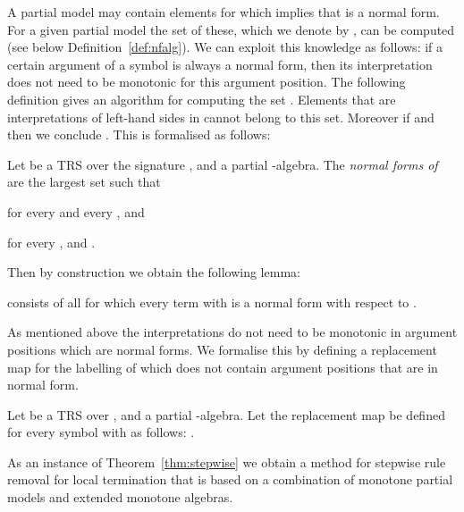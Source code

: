 A partial model 
may contain elements 
for which  implies that  is a normal form.
For a given partial model the set of these, which we denote by , can be computed (see below Definition~\ref{def:nfalg}).
We can exploit this knowledge as follows:
if a certain argument of a symbol 
is always a normal form, then its interpretation 
does not need to be monotonic for this argument position.
The following definition gives an algorithm for computing the set .
Elements that are interpretations  of left-hand sides in 
cannot belong to this set. Moreover if 
and  then we conclude .
This is formalised as follows:
\begin{definition}\normalfont\label{def:nfalg}
  Let  be a TRS over the signature , and  a partial -algebra.
  The \emph{normal forms  of }
  are the largest set  such that
  
  for every  and every ,
  and
   
  for every ,  and .
\end{definition}
Then by construction we obtain the following lemma:
\begin{lemma}\label{lem:nfalg}
   consists of all  
  for which 
  every term  with  is a normal form with respect to .
\end{lemma}
As mentioned above the interpretations do not need to be monotonic in argument positions
which are normal forms. We formalise this by defining a replacement map 
for the labelling  of  which does not contain
argument positions that are in normal form.
\begin{definition}\normalfont\label{def:qtransform}
  Let  be a TRS over ,
  and  a partial -algebra.
  Let the replacement map  be defined for 
  every symbol  with  as follows:
  .
\end{definition}

As an instance of Theorem~\ref{thm:stepwise}
we obtain a method for stepwise rule removal for local termination that is based
on a combination of monotone partial models 
and extended monotone algebras.


